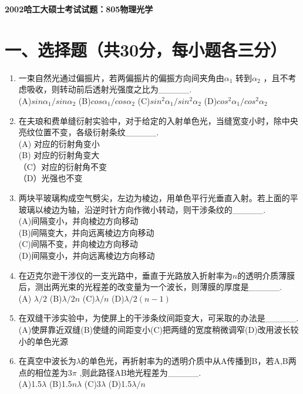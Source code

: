 \documentclass[12pt, a4paper]{article}
\theoremstyle{solution}
\begin{document}
\begin{center}
\Large\textbf{2002哈工大硕士考试试题：805物理光学}
\end{center}




\section*{一、选择题（共30分，每小题各三分）}
\begin{enumerate}
    \item 一束自然光通过偏振片，若两偏振片的偏振方向间夹角由\(\alpha_1\) 转到\(\alpha_2\) ，且不考虑吸收，则转动前后透射光强度之比为\_\_\_\_\_.\\(A)\(sin\alpha_1/sin\alpha_2\)  \quad
    (B)\(cos\alpha_1/cos\alpha_2\) \quad
    (C)\(sin^2\alpha_1/sin^2\alpha_2\) \quad
    (D)\(cos^2\alpha_1/cos^2\alpha_2\)
    \item 在夫琅和费单缝衍射实验中，对于给定的入射单色光，当缝宽变小时，除中央亮纹位置不变，各级衍射条纹\_\_\_\_\_.\\(A) 对应的衍射角变小\\(B) 对应的衍射角变大\\（C）对应的衍射角不变\\（D）光强也不变
    \item 两块平玻璃构成空气劈尖，左边为棱边，用单色平行光垂直入射。若上面的平玻璃以棱边为轴，沿逆时针方向作微小转动，则干涉条纹的\_\_\_\_\_.\\(A)间隔变小，并向棱边方向移动\\(B)间隔变大，并向远离棱边方向移动\\(C)间隔不变，并向棱边方向移动\\(D)间隔变小，并向远离棱边方向移动
    \item 在迈克尔逊干涉仪的一支光路中，垂直于光路放入折射率为\(n\)的透明介质薄膜后，测出两光束的光程差的改变量为一个波长，则薄膜的厚度是\_\_\_\_\_.\\(A) $\lambda/2$ \qquad (B)$\lambda/2n$ \qquad (C)$\lambda/n$ \qquad (D)$\lambda/2(n-1)$
    \item 在双缝干涉实验中，为使屏上的干涉条纹间距变大，可采取的办法是\_\_\_\_\_.\\(A)使屏靠近双缝\qquad(B)使缝的间距变小\qquad(C)把两缝的宽度稍微调窄\qquad(D)改用波长较小的单色光源
    \item 在真空中波长为$\lambda$的单色光，再折射率为\n 的透明介质中从A传播到B，若A,B两点的相位差为3\(\pi\) ,则此路径AB地光程差为\_\_\_\_\_.\\(A)1.5\(\lambda\) \qquad(B)1.5\(n\lambda\) \qquad(C)3\(\lambda\) \qquad(D)1.5\(\lambda/n\)

\end{enumerate}
\end{document}
